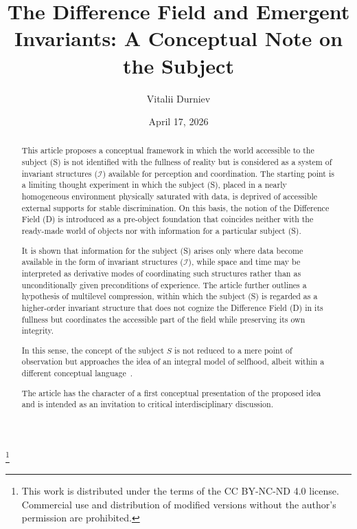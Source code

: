 \documentclass[aps,prd,onecolumn,nofootinbib,superscriptaddress]{revtex4-2}
\newcommand{\papertitle}{The Difference Field and Emergent Invariants: A Conceptual Note on the Subject}
\newcommand{\paperauthor}{Vitalii Durniev}
\begin{document}
\title{\papertitle}

\thanks{This work is distributed under the terms of the CC BY-NC-ND 4.0 license. Commercial use and distribution of modified versions without the author's permission are prohibited.}

\author{\paperauthor}

\date{April 17, 2026}

\begin{abstract}
This article proposes a conceptual framework in which the world accessible to the subject (S) is not identified with the fullness of reality but is considered as a system of invariant structures ($\mathcal{I}$) available for perception and coordination. The starting point is a limiting thought experiment in which the subject (S), placed in a nearly homogeneous environment physically saturated with data, is deprived of accessible external supports for stable discrimination. On this basis, the notion of the Difference Field (D) is introduced as a pre-object foundation that coincides neither with the ready-made world of objects nor with information for a particular subject (S).

It is shown that information for the subject (S) arises only where data become available in the form of invariant structures ($\mathcal{I}$), while space and time may be interpreted as derivative modes of coordinating such structures rather than as unconditionally given preconditions of experience. The article further outlines a hypothesis of multilevel compression, within which the subject (S) is regarded as a higher-order invariant structure that does not cognize the Difference Field (D) in its fullness but coordinates the accessible part of the field while preserving its own integrity.

In this sense, the concept of the subject \(S\) is not reduced to a mere point of observation but approaches the idea of an integral model of selfhood, albeit within a different conceptual language~\cite{Metzinger2003}.

The article has the character of a first conceptual presentation of the proposed idea and is intended as an invitation to critical interdisciplinary discussion.
\end{abstract}

\maketitle
\end{document}
